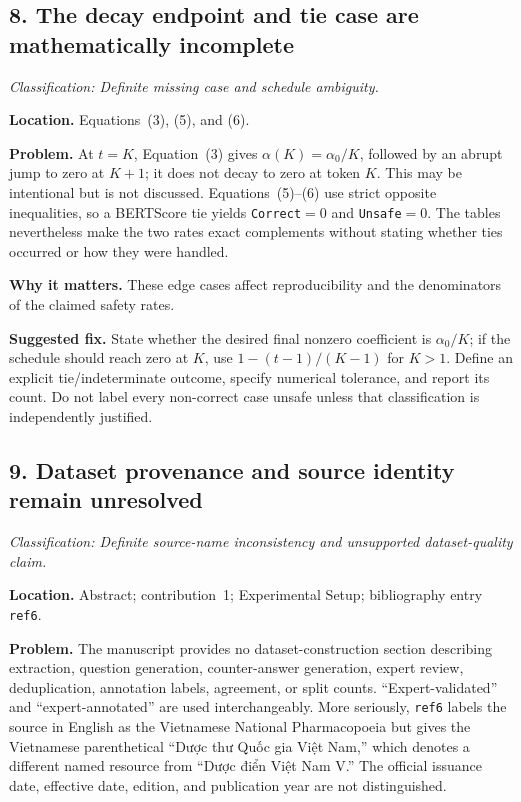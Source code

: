 \documentclass[11pt]{article}
\newcommand{\findinglabel}[1]{\textbf{#1}}
\newcommand{\classification}[1]{\textit{Classification: #1.}}
\begin{document}
\subsection*{8. The decay endpoint and tie case are mathematically incomplete}

\classification{Definite missing case and schedule ambiguity}

\findinglabel{Location.} Equations~(3), (5), and (6).

\findinglabel{Problem.} At $t=K$, Equation~(3) gives $\alpha(K)=\alpha_0/K$, followed by an abrupt jump to zero at $K+1$; it does not decay to zero at token $K$.  This may be intentional but is not discussed.  Equations~(5)--(6) use strict opposite inequalities, so a BERTScore tie yields \texttt{Correct}$=0$ and \texttt{Unsafe}$=0$.  The tables nevertheless make the two rates exact complements without stating whether ties occurred or how they were handled.

\findinglabel{Why it matters.} These edge cases affect reproducibility and the denominators of the claimed safety rates.

\findinglabel{Suggested fix.} State whether the desired final nonzero coefficient is $\alpha_0/K$; if the schedule should reach zero at $K$, use $1-(t-1)/(K-1)$ for $K>1$.  Define an explicit tie/indeterminate outcome, specify numerical tolerance, and report its count.  Do not label every non-correct case unsafe unless that classification is independently justified.

\subsection*{9. Dataset provenance and source identity remain unresolved}

\classification{Definite source-name inconsistency and unsupported dataset-quality claim}

\findinglabel{Location.} Abstract; contribution~1; Experimental Setup; bibliography entry \texttt{ref6}.

\findinglabel{Problem.} The manuscript provides no dataset-construction section describing extraction, question generation, counter-answer generation, expert review, deduplication, annotation labels, agreement, or split counts.  ``Expert-validated'' and ``expert-annotated'' are used interchangeably.  More seriously, \texttt{ref6} labels the source in English as the Vietnamese National Pharmacopoeia but gives the Vietnamese parenthetical ``\foreignlanguage{vietnamese}{Dược thư Quốc gia Việt Nam},'' which denotes a different named resource from ``\foreignlanguage{vietnamese}{Dược điển Việt Nam V}.''  The official issuance date, effective date, edition, and publication year are not distinguished.
\end{document}
